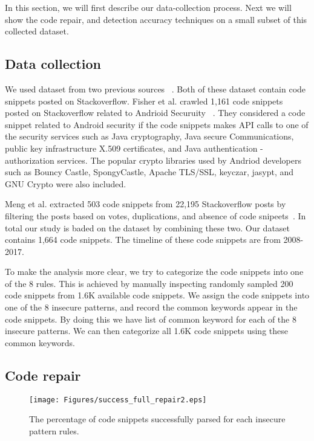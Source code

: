 In this section, we will first describe our data-collection process. Next we will show the code repair, and detection accuracy techniques on a small subset of this collected dataset.   

\subsection{Data collection} 
  We used dataset from two previous sources ~\cite{meng2018secure,fischer2017stack}. Both of these dataset contain code snippets posted on Stackoverflow. 
  Fisher et al. crawled 1,161 code snippets posted on Stackoverflow related to Andrioid Securuity ~\cite{fischer2017stack}. They considered a code snippet related to Android security if the code snippets makes API calls to
  one of the security services such as Java cryptography, Java secure Communications, public key infrastructure X.509 certificates, and Java authentication - authorization services. The popular crypto libraries used by Andriod developers such as Bouncy Castle, SpongyCastle, Apache TLS/SSL, keyczar, jasypt, and GNU Crypto were also included. 
  
  Meng et al.  extracted 503 code snippets from 22,195 Stackoverflow posts by filtering the posts based on votes, duplications, and absence of code snipeets~\cite{meng2018secure}. In total our study is baded on the dataset by combining these two. Our dataset contains 1,664 code snippets. The timeline of these code snippets are from 2008-2017.

  To make the analysis more clear, we try to categorize the code snippets into one of the 8 rules. This is achieved by manually inspecting randomly sampled 200 code snippets from 1.6K available code snippets. We assign the code snippets into one of the 8 insecure patterns, and record the common keywords appear in the code snippets. By doing this we have list of common keyword for each of the 8 insecure patterns. We can then categorize all 1.6K code snippets using these common keywords.
  

\subsection{Code repair} 
\begin{figure}[ht]
\centering
\texttt{[image: Figures/success\_full\_repair2.eps]}
\caption{The percentage of code snippets successfully parsed for each insecure pattern rules.}
\label{fig:code-repair}
\end{figure}

